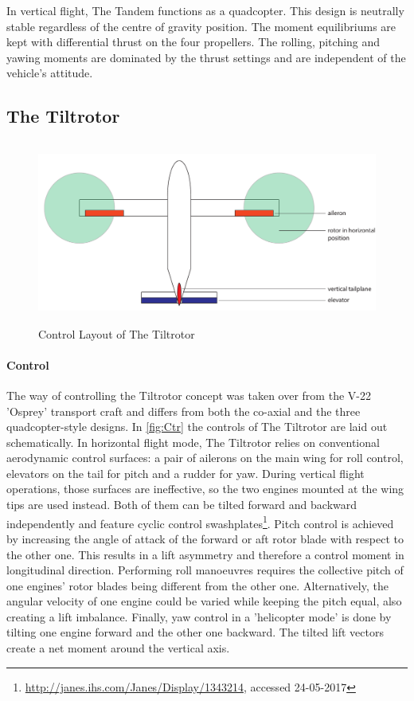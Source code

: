 In vertical flight, The Tandem functions as a quadcopter. This design is neutrally stable regardless of the centre of gravity position. The moment equilibriums are kept with differential thrust on the four propellers. The rolling, pitching and yawing moments are dominated by the thrust settings and are independent of the vehicle's attitude.
\subsection{The Tiltrotor}

\begin{figure}[htb]
    \centering
    \includegraphics[height=6cm]{Stability/Figures/concept_4.pdf}
    \caption{Control Layout of The Tiltrotor}
    \label{fig:Ctr}
\end{figure}
\paragraph{Control}

The way of controlling the Tiltrotor concept was taken over from the V-22 'Osprey' transport craft and differs from both the co-axial and the three quadcopter-style designs. In \autoref{fig:Ctr} the controls of The Tiltrotor are laid out schematically.
In horizontal flight mode, The Tiltrotor relies on conventional aerodynamic control surfaces: a pair of ailerons on the main wing for roll control, elevators on the tail for pitch and a rudder for yaw. During vertical flight operations, those surfaces are ineffective, so the two engines mounted at the wing tips are used instead. Both of them can be tilted forward and backward independently and feature cyclic control swashplates\footnote{\url{http://janes.ihs.com/Janes/Display/1343214}, accessed 24-05-2017}. Pitch control is achieved by increasing the angle of attack of the forward or aft rotor blade with respect to the other one. This results in a lift asymmetry and therefore a control moment in longitudinal direction. Performing roll manoeuvres requires the collective pitch of one engines' rotor blades being different from the other one. Alternatively, the angular velocity of one engine could be varied while keeping the pitch equal, also creating a lift imbalance. Finally, yaw control in a 'helicopter mode' is done by tilting one engine forward and the other one backward. The tilted lift vectors create a net moment around the vertical axis.

